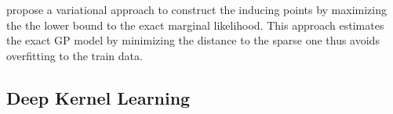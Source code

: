 \cite{pmlr-v5-titsias09a} propose a variational approach to construct the inducing points by maximizing the the lower bound to the exact marginal likelihood. This approach estimates the exact GP model by minimizing the distance to the sparse one  thus avoids overfitting to the train data.

\subsection{Deep Kernel Learning}


